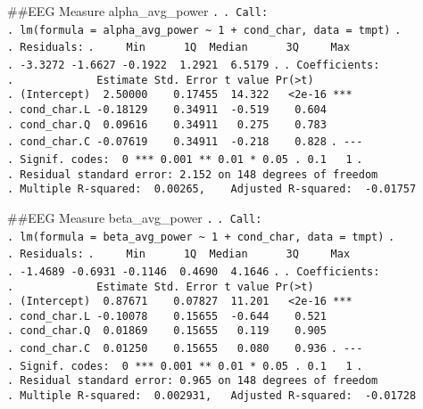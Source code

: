 \documentclass[
]{article}
\begin{document}
\#\#EEG Measure alpha\_avg\_power \texttt{.} \texttt{.\ Call:}
\texttt{.\ lm(formula\ =\ alpha\_avg\_power\ \textasciitilde{}\ 1\ +\ cond\_char,\ data\ =\ tmpt)}
\texttt{.} \texttt{.\ Residuals:}
\texttt{.\ \ \ \ \ Min\ \ \ \ \ \ 1Q\ \ Median\ \ \ \ \ \ 3Q\ \ \ \ \ Max}
\texttt{.\ -3.3272\ -1.6627\ -0.1922\ \ 1.2921\ \ 6.5179} \texttt{.}
\texttt{.\ Coefficients:}
\texttt{.\ \ \ \ \ \ \ \ \ \ \ \ \ Estimate\ Std.\ Error\ t\ value\ Pr(\textgreater{}\textbar{}t\textbar{})}
\texttt{.\ (Intercept)\ \ 2.50000\ \ \ \ 0.17455\ \ 14.322\ \ \ \textless{}2e-16\ ***}
\texttt{.\ cond\_char.L\ -0.18129\ \ \ \ 0.34911\ \ -0.519\ \ \ \ 0.604}
\texttt{.\ cond\_char.Q\ \ 0.09616\ \ \ \ 0.34911\ \ \ 0.275\ \ \ \ 0.783}
\texttt{.\ cond\_char.C\ -0.07619\ \ \ \ 0.34911\ \ -0.218\ \ \ \ 0.828}
\texttt{.\ -\/-\/-}
\texttt{.\ Signif.\ codes:\ \ 0\ \textquotesingle{}***\textquotesingle{}\ 0.001\ \textquotesingle{}**\textquotesingle{}\ 0.01\ \textquotesingle{}*\textquotesingle{}\ 0.05\ \textquotesingle{}.\textquotesingle{}\ 0.1\ \textquotesingle{}\ \textquotesingle{}\ 1}
\texttt{.}
\texttt{.\ Residual\ standard\ error:\ 2.152\ on\ 148\ degrees\ of\ freedom}
\texttt{.\ Multiple\ R-squared:\ \ 0.00265,\ \ \ \ Adjusted\ R-squared:\ \ -0.01757}

\#\#EEG Measure beta\_avg\_power \texttt{.} \texttt{.\ Call:}
\texttt{.\ lm(formula\ =\ beta\_avg\_power\ \textasciitilde{}\ 1\ +\ cond\_char,\ data\ =\ tmpt)}
\texttt{.} \texttt{.\ Residuals:}
\texttt{.\ \ \ \ \ Min\ \ \ \ \ \ 1Q\ \ Median\ \ \ \ \ \ 3Q\ \ \ \ \ Max}
\texttt{.\ -1.4689\ -0.6931\ -0.1146\ \ 0.4690\ \ 4.1646} \texttt{.}
\texttt{.\ Coefficients:}
\texttt{.\ \ \ \ \ \ \ \ \ \ \ \ \ Estimate\ Std.\ Error\ t\ value\ Pr(\textgreater{}\textbar{}t\textbar{})}
\texttt{.\ (Intercept)\ \ 0.87671\ \ \ \ 0.07827\ \ 11.201\ \ \ \textless{}2e-16\ ***}
\texttt{.\ cond\_char.L\ -0.10078\ \ \ \ 0.15655\ \ -0.644\ \ \ \ 0.521}
\texttt{.\ cond\_char.Q\ \ 0.01869\ \ \ \ 0.15655\ \ \ 0.119\ \ \ \ 0.905}
\texttt{.\ cond\_char.C\ \ 0.01250\ \ \ \ 0.15655\ \ \ 0.080\ \ \ \ 0.936}
\texttt{.\ -\/-\/-}
\texttt{.\ Signif.\ codes:\ \ 0\ \textquotesingle{}***\textquotesingle{}\ 0.001\ \textquotesingle{}**\textquotesingle{}\ 0.01\ \textquotesingle{}*\textquotesingle{}\ 0.05\ \textquotesingle{}.\textquotesingle{}\ 0.1\ \textquotesingle{}\ \textquotesingle{}\ 1}
\texttt{.}
\texttt{.\ Residual\ standard\ error:\ 0.965\ on\ 148\ degrees\ of\ freedom}
\texttt{.\ Multiple\ R-squared:\ \ 0.002931,\ \ \ Adjusted\ R-squared:\ \ -0.01728}
\end{document}
